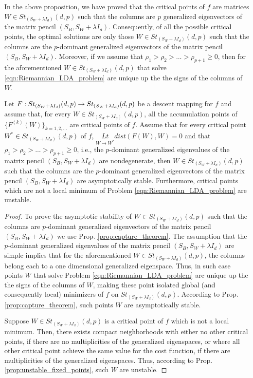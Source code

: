 \documentclass[11pt,a4paper]{article}
\begin{document}
\begin{remark}
In the above proposition, we have proved that the critical points of $f$ are matrices $W\in St_{(S_W+\lambda I_d)}(d,p)$ such that the columns are $p$ generalized eigenvectors of the matrix pencil $(S_B,S_W+\lambda I_d)$. Consequently, of all the possible critical points, the optimal solutions are only those $W\in St_{(S_W+\lambda I_d)}(d,p)$ such that the columns are the $p$-dominant generalized eigenvectors of the matrix pencil $(S_B,S_W+\lambda I_d)$. Moreover, if we assume that $\rho_1>\rho_2>\ldots>\rho_{p+1}\ge 0$, then for the aforementioned $W\in St_{(S_W+\lambda I_d)}(d,p)$ that solve \eqref{eqn:Riemannian_LDA_problem} are unique up the the signs of the columns of $W$.
\end{remark}

\begin{proposition}
Let $F:St_{(S_W+\lambda I_d)}(d,p)\rightarrow St_{(S_W+\lambda I_d)}(d,p)$ be a descent mapping for $f$ and assume that, for every $W\in St_{(S_W+\lambda I_d)}(d,p)$, all the accumulation points of $\{F^{(k)}(W)\}_{k=1,2,\ldots}$ are critical points of $f$. Assume that for every critical point $W^*\in St_{(S_W+\lambda I_d)}(d,p)$ of $f$, $\underset{W\rightarrow W^*}{Lt}dist(F(W),W) = 0$ and that $\rho_1>\rho_2>\ldots>\rho_{p+1}\ge 0$, i.e., the $p$-dominant generalized eigenvalues of the matrix pencil $(S_B,S_W+\lambda I_d)$ are nondegenerate, then $W\in St_{(S_W+\lambda I_d)}(d,p)$ such that the columns are the $p$-dominant generalized eigenvectors of the matrix pencil $(S_B,S_W+\lambda I_d)$ are asymptotically stable. Furthermore, critical points which are not a local minimum of Problem \eqref{eqn:Riemannian_LDA_problem} are unstable.
\end{proposition}

\begin{proof}
To prove the asymptotic stability of $W\in St_{(S_W+\lambda I_d)}(d,p)$ such that the columns are $p$-dominant generalized eigenvectors of the matrix pencil $(S_B, S_W + \lambda I_d)$ we use Prop. \ref{prop:capture_theorem}. The assumption that the $p$-dominant generalized eigenvalues of the matrix pencil $(S_B, S_W + \lambda I_d)$ are simple implies that for the aforementioned $W\in St_{(S_W+\lambda I_d)}(d,p)$, the columns belong each to a one dimensional generalized eigenspace. Thus, in such case points $W$ that solve Problem \eqref{eqn:Riemannian_LDA_problem} are unique up the the signs of the columns of $W$, making these point isolated global (and consequently local) minimizers of $f$ on $St_{(S_W+\lambda I_d)}(d,p)$. According to Prop. \ref{prop:capture_theorem}, such points $W$ are asymptotically stable.

Suppose $W\in St_{(S_W+\lambda I_d)}(d,p)$ is a critical point of $f$ which is not a local minimum. Then, there exists compact neighborhoods with either no other critical points, if there are no
multiplicities of the generalized eigenspaces, or where all other critical point achieve the same value for the cost function, if there are multiplicities of the generalized eigenspaces. Thus, according to Prop. \ref{prop:unstable_fixed_points}, such $W$ are unstable.
\end{proof}
\end{document}
